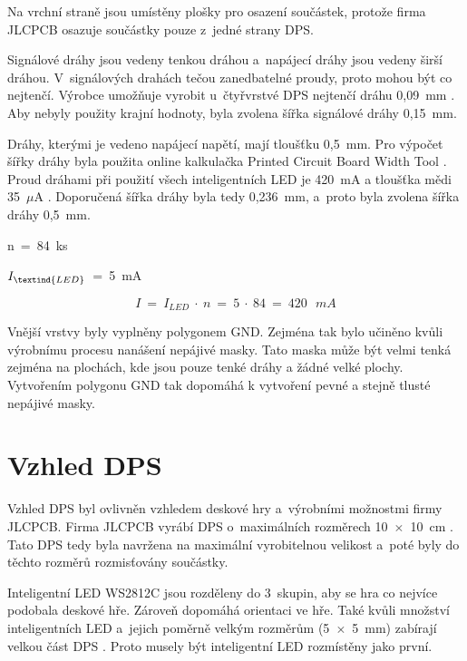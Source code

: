   Na vrchní straně jsou umístěny plošky pro osazení součástek, protože firma JLCPCB osazuje součástky pouze z~jedné strany DPS.

  Signálové dráhy jsou vedeny tenkou dráhou a~napájecí dráhy jsou vedeny širší dráhou. V~signálových drahách tečou zanedbatelné 
  proudy, proto mohou být co nejtenčí. Výrobce umožňuje vyrobit u~čtyřvrstvé DPS nejtenčí dráhu 0,09~mm \cite{JLCPCB_Capabilities}. 
  Aby nebyly použity krajní hodnoty, byla zvolena šířka signálové dráhy 0,15~mm.

  Dráhy, kterými je vedeno napájecí napětí, mají tloušťku 0,5~mm. Pro výpočet šířky dráhy byla použita online kalkulačka Printed
  Circuit Board Width Tool \cite{Kalkulacka_drahy_DPS}. Proud dráhami při použití všech inteligentních LED je 420~mA a tloušťka 
  mědi 35~$\mu$A \cite{JLCPCB_Capabilities}. Doporučená šířka dráhy byla tedy 0,236~mm, a~proto byla zvolena šířka dráhy 0,5~mm.

  n~=~84~ks

  $I_\textind{LED}$~=~5~mA 

  \begin{equation} 
    I~=~I_{LED}~\cdot~n~=~5~\cdot~84~=~420~\:~mA
  \end{equation}

  Vnější vrstvy byly vyplněny polygonem GND. Zejména tak bylo učiněno kvůli výrobnímu procesu nanášení nepájivé masky. Tato maska
  může být velmi tenká zejména na plochách, kde jsou pouze tenké dráhy a žádné velké plochy. Vytvořením polygonu GND tak dopomáhá k 
  vytvoření pevné a stejně tlusté nepájivé masky. 

  \section{Vzhled DPS}
  Vzhled DPS byl ovlivněn vzhledem deskové hry a~výrobními možnostmi firmy JLCPCB. Firma JLCPCB vyrábí DPS o~maximálních %
  rozměrech 10~$\times$~10~cm \cite{JLCPCB}. Tato DPS tedy byla navržena na maximální vyrobitelnou velikost a~poté byly do těchto 
  rozměrů rozmisťovány součástky.

  Inteligentní LED WS2812C jsou rozděleny do 3~skupin, aby se hra co nejvíce podobala deskové hře. Zároveň dopomáhá orientaci ve hře.
  Také kvůli množství inteligentních LED a~jejich poměrně velkým rozměrům (5~$\times$~5~mm) zabírají velkou část DPS 
  \cite{WS2812C_datasheet}. Proto musely být inteligentní LED rozmístěny jako první.


